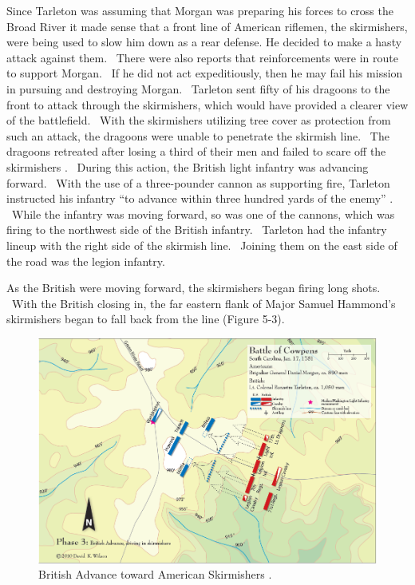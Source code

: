 Since Tarleton was assuming that Morgan was preparing his forces to cross the
Broad River it made sense that a front line of American riflemen, the
skirmishers, were being used to slow him down as a rear defense.  He decided to
make a hasty attack against them.  There were also reports that reinforcements
were in route to support Morgan.  If he did not act expeditiously, then he may
fail his mission in pursuing and destroying Morgan.  Tarleton sent fifty of his
dragoons to the front to attack through the skirmishers, which would have
provided a clearer view of the battlefield.  With the skirmishers utilizing tree
cover as protection from such an attack, the dragoons were unable to penetrate
the skirmish line.  The dragoons retreated after losing a third of their men and
failed to scare off the skirmishers \cite[p.328]{stephenson_patriot_2007}.  During this action,
the British light infantry was advancing forward.  With the use of a
three-pounder cannon as supporting fire, Tarleton instructed his infantry “to
advance within three hundred yards of the enemy” \cite[p.84]{babits_devil_2001}.  While the
infantry was moving forward, so was one of the cannons, which was firing to the
northwest side of the British infantry.  Tarleton had the infantry lineup with
the right side of the skirmish line.  Joining them on the east side of the road
was the legion infantry.  

As the British were moving forward, the skirmishers began firing long shots.
 With the British closing in, the far eastern flank of Major Samuel Hammond’s
skirmishers began to fall back from the line (Figure 5-3).  


\begin{figure}[ht]
    \begin{center}
    \includegraphics[width=\textwidth]{gfx/beiber03}
    \end{center}
    \caption{British Advance toward American Skirmishers \cite{wilson_blogmap}.}
    \label{beiber03}
\end{figure}

